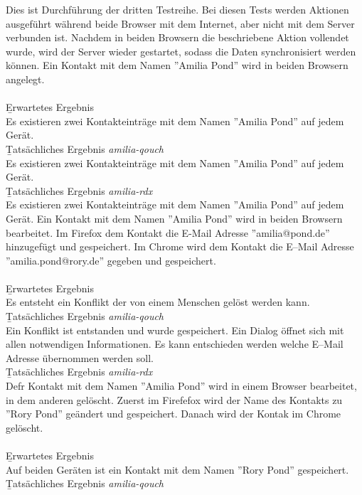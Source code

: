 Dies ist Durchführung der dritten Testreihe.
Bei diesen Tests werden Aktionen ausgeführt während beide Browser mit dem Internet, aber nicht mit dem Server verbunden ist.
Nachdem in beiden Browsern die beschriebene Aktion vollendet wurde, wird der Server wieder gestartet, sodass die Daten synchronisiert werden können. 
%
Ein Kontakt mit dem Namen ''Amilia Pond'' wird in beiden Browsern angelegt.\\\\
\b{Erwartetes Ergebnis}\\
Es existieren zwei Kontakteinträge mit dem Namen ''Amilia Pond'' auf jedem Gerät.\\
\b{Tatsächliches Ergebnis \it{amilia-qouch}}\\
Es existieren zwei Kontakteinträge mit dem Namen ''Amilia Pond'' auf jedem Gerät.\\
\b{Tatsächliches Ergebnis \it{amilia-rdx}}\\
Es existieren zwei Kontakteinträge mit dem Namen ''Amilia Pond'' auf jedem Gerät.
%
Ein Kontakt mit dem Namen ''Amilia Pond'' wird in beiden Browsern bearbeitet. Im Firefox dem Kontakt die E-Mail Adresse ''amilia@pond.de'' hinzugefügt und gespeichert.
Im Chrome wird dem Kontakt die E--Mail Adresse ''amilia.pond@rory.de'' gegeben und gespeichert.\\\\
\b{Erwartetes Ergebnis}\\
Es entsteht ein Konflikt der von einem Menschen gelöst werden kann.\\
\b{Tatsächliches Ergebnis \it{amilia-qouch}}\\
Ein Konflikt ist entstanden und wurde gespeichert. Ein Dialog öffnet sich mit allen notwendigen Informationen.
Es kann entschieden werden welche E--Mail Adresse übernommen werden soll.\\
\b{Tatsächliches Ergebnis \it{amilia-rdx}}\\
%
Defr Kontakt mit dem Namen ''Amilia Pond'' wird in einem Browser bearbeitet, in dem anderen gelöscht.
Zuerst im Firefefox wird der Name des Kontakts zu ''Rory Pond'' geändert und gespeichert.
Danach wird der Kontak im Chrome gelöscht.\\\\
\b{Erwartetes Ergebnis}\\
Auf beiden Geräten ist ein Kontakt mit dem Namen ''Rory Pond'' gespeichert.\\
\b{Tatsächliches Ergebnis \it{amilia-qouch}}\\
